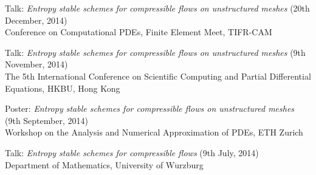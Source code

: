\documentclass[margin]{res}
\begin{document}
\begin{resume}
              Talk: {\it Entropy stable schemes for compressible flows on unstructured meshes} (20th December, 2014)\\
               Conference on Computational PDEs, Finite Element Meet, TIFR-CAM  
              
              Talk: {\it Entropy stable schemes for compressible flows on unstructured meshes} (9th November, 2014)\\
               The 5th International Conference on Scientific Computing and Partial Differential Equations, HKBU, Hong Kong              
             
              Poster: {\it Entropy stable schemes for compressible flows on unstructured meshes} (9th September, 2014)\\
               Workshop on the Analysis and Numerical Approximation of PDEs, ETH Zurich
              
              Talk: {\it Entropy stable schemes for compressible flows} (9th July, 2014)\\
               Department of Mathematics, University of W$\ddot{\text{u}}$rzburg             


\end{resume}
\end{document}
